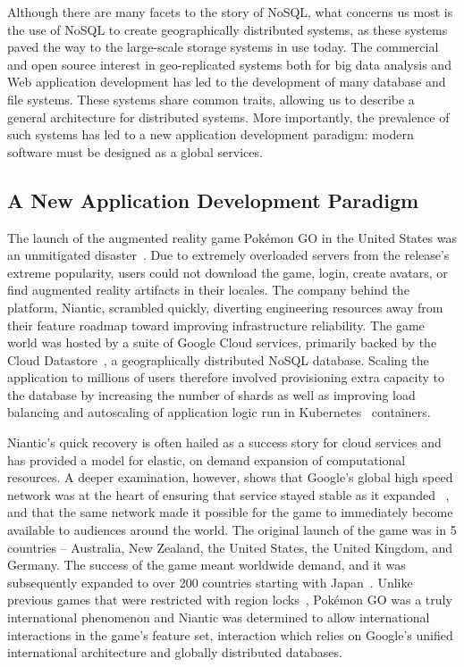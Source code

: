 Although there are many facets to the story of NoSQL, what concerns us most is the use of NoSQL to create geographically distributed systems, as these systems paved the way to the large-scale storage systems in use today.
The commercial and open source interest in geo-replicated systems both for big data analysis and Web application development has led to the development of many database and file systems.
These systems share common traits, allowing us to describe a general architecture for distributed systems.
More importantly, the prevalence of such systems has led to a new application development paradigm: modern software must be designed as a global services.

\subsection{A New Application Development Paradigm}

The launch of the augmented reality game Pokémon GO in the United States was an unmitigated disaster~\cite{kain_pokemon_2016}.
Due to extremely overloaded servers from the release's extreme popularity, users could not download the game, login, create avatars, or find augmented reality artifacts in their locales.
The company behind the platform, Niantic, scrambled quickly, diverting engineering resources away from their feature roadmap toward improving infrastructure reliability.
The game world was hosted by a suite of Google Cloud services, primarily backed by the Cloud Datastore~\cite{cloud_datastore}, a geographically distributed NoSQL database.
Scaling the application to millions of users therefore involved provisioning extra capacity to the database by increasing the number of shards as well as improving load balancing and autoscaling of application logic run in Kubernetes~\cite{Kubernetes} containers.

Niantic's quick recovery is often hailed as a success story for cloud services and has provided a model for elastic, on demand expansion of computational resources.
A deeper examination, however, shows that Google's global high speed network was at the heart of ensuring that service stayed stable as it expanded ~\cite{stone_bringing_2016}, and that the same network made it possible for the game to immediately become available to audiences around the world.
The original launch of the game was in 5 countries -- Australia, New Zealand, the United States, the United Kingdom, and Germany.
The success of the game meant worldwide demand, and it was subsequently expanded to over 200 countries starting with Japan~\cite{yamazaki_developer_2016}.
Unlike previous games that were restricted with region locks~\cite{region_locking}, Pokémon GO was a truly international phenomenon and Niantic was determined to allow international interactions in the game's feature set, interaction which relies on Google's unified international architecture and globally distributed databases.


